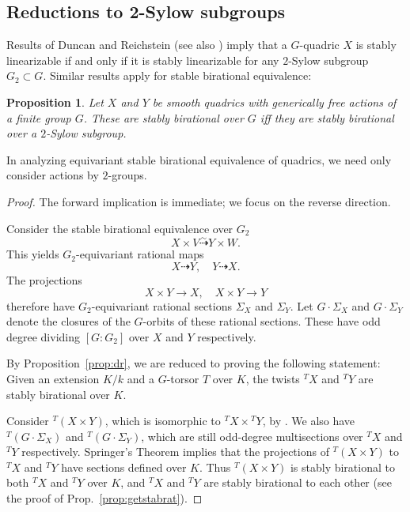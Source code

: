 \documentclass[12pt]{amsart}
\numberwithin{equation}{section}
\theoremstyle{plain}
\newtheorem{prop}{Proposition}[section]
\theoremstyle{definition}
\theoremstyle{remark}
\begin{document}
\subsection*{Reductions to 2-Sylow subgroups}
Results of Duncan and Reichstein \cite[Th.~10.2]{DR}
(see also \cite[Sec.~5.3]{HTEGLDQ}) imply that a $G$-quadric $X$ is stably linearizable
if and only if it is stably linearizable for any
$2$-Sylow subgroup $G_2\subset G$.  
Similar results apply for stable birational equivalence:
\begin{prop}
Let $X$ and $Y$ be smooth quadrics with 
generically free
actions of a finite group $G$.  
These are stably birational over $G$ iff
they are stably birational over a $2$-Sylow subgroup.
\end{prop}
In analyzing equivariant stable birational equivalence of quadrics, we need only consider
actions by $2$-groups.  
\begin{proof}
The forward implication is immediate; we focus on the reverse direction. 

Consider the stable birational equivalence over $G_2$
$$X \times V \stackrel{\sim}{\dashrightarrow} Y \times W.$$
This yields $G_2$-equivariant rational maps
$$X \dashrightarrow Y, \quad Y \dashrightarrow X.$$ 
The projections
$$X\times Y \rightarrow X, \quad X\times Y\rightarrow Y$$
therefore have $G_2$-equivariant rational sections
$\Sigma_X$ and $\Sigma_Y$.  
Let $G\cdot \Sigma_X$ and $G\cdot \Sigma_Y$ denote the closures of
the $G$-orbits of these rational sections. These have odd degree dividing
$[G:G_2]$ over $X$ and $Y$ respectively.  


By Proposition~\ref{prop:dr}, we are reduced to proving the following statement: Given
an extension $K/k$ and a $G$-torsor $T$ over $K$, the twists ${ }^TX$ and ${ }^TY$
are stably birational over $K$. 

Consider ${ }^T(X\times Y)$, which is isomorphic to ${ }^TX \times { }^TY$, by \cite[Cor.~3.4(a)]{DR}.
We also have ${ }^T(G\cdot \Sigma_X)$ and ${}^T(G\cdot \Sigma_Y)$, which are still
odd-degree multisections over ${ }^TX$ and ${ }^TY$ respectively.  Springer's Theorem
implies that the projections of
${ }^T(X\times Y)$ to ${ }^TX$ and ${ }^TY$ have sections defined over $K$.
Thus ${ }^T(X\times Y)$ is stably birational to both ${ }^TX$ and ${ }^TY$ over 
$K$, and ${ }^TX$ and ${ }^TY$ are stably birational to each other
(see the proof of Prop.~\ref{prop:getstabrat}).
\end{proof}
\end{document}
